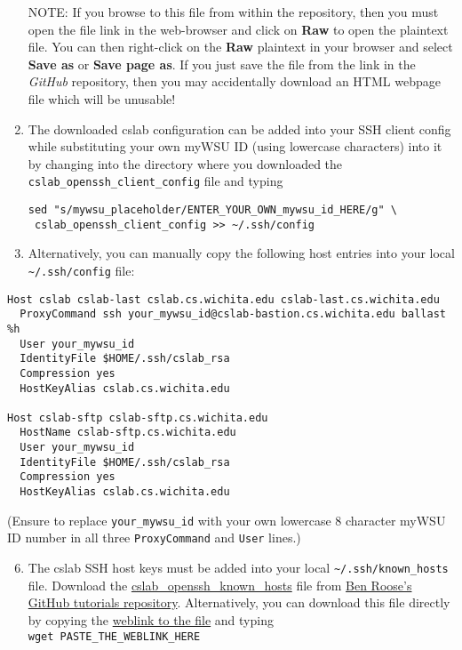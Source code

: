\documentclass[12pt]{article}
\begin{document}
\begin{flushleft}
\begin{enumerate}
    NOTE: If you browse to this file from within the repository, then you must open the file link in the web-browser and click on \textbf{Raw} to open the plaintext file. You can then right-click on the \textbf{Raw} plaintext in your browser and select \textbf{Save as} or \textbf{Save page as}. If you just save the file from the link in the \textit{GitHub} repository, then you may accidentally download an HTML webpage file which will be unusable!

  \item The downloaded cslab configuration can be added into your SSH client config while substituting your own myWSU ID (using lowercase characters) into it by changing into the directory where you downloaded the \verb|cslab_openssh_client_config| file and typing
\begin{verbatim}
sed "s/mywsu_placeholder/ENTER_YOUR_OWN_mywsu_id_HERE/g" \
 cslab_openssh_client_config >> ~/.ssh/config
\end{verbatim}

\newpage

  \item Alternatively, you can manually copy the following host entries into your local \verb|~/.ssh/config| file:
\end{enumerate}

\begin{verbatim}
Host cslab cslab-last cslab.cs.wichita.edu cslab-last.cs.wichita.edu
  ProxyCommand ssh your_mywsu_id@cslab-bastion.cs.wichita.edu ballast %h
  User your_mywsu_id
  IdentityFile $HOME/.ssh/cslab_rsa
  Compression yes
  HostKeyAlias cslab.cs.wichita.edu

Host cslab-sftp cslab-sftp.cs.wichita.edu
  HostName cslab-sftp.cs.wichita.edu
  User your_mywsu_id
  IdentityFile $HOME/.ssh/cslab_rsa
  Compression yes
  HostKeyAlias cslab.cs.wichita.edu
\end{verbatim}
(Ensure to replace \verb|your_mywsu_id| with your own lowercase 8 character myWSU ID number in all three \texttt{ProxyCommand} and \texttt{User} lines.)

\begin{enumerate}
  \setcounter{enumi}{5}
  \item The cslab SSH host keys must be added into your local \verb|~/.ssh/known_hosts| file. Download the \href{https://raw.githubusercontent.com/benroose/tutorials/master/cslab_tutorials/cslab_ssh_client_config_files/cslab_openssh_known_hosts}{cslab\_openssh\_known\_hosts} file from \href{https://github.com/benroose/tutorials/tree/master/cslab_tutorials/}{Ben Roose's GitHub tutorials repository}.  Alternatively, you can download this file directly by copying the \href{https://raw.githubusercontent.com/benroose/tutorials/master/cslab_tutorials/cslab_ssh_client_config_files/cslab_openssh_known_hosts}{weblink to the file} and typing\\
    \verb|wget PASTE_THE_WEBLINK_HERE|
    

\end{enumerate}
\end{flushleft}
\end{document}

